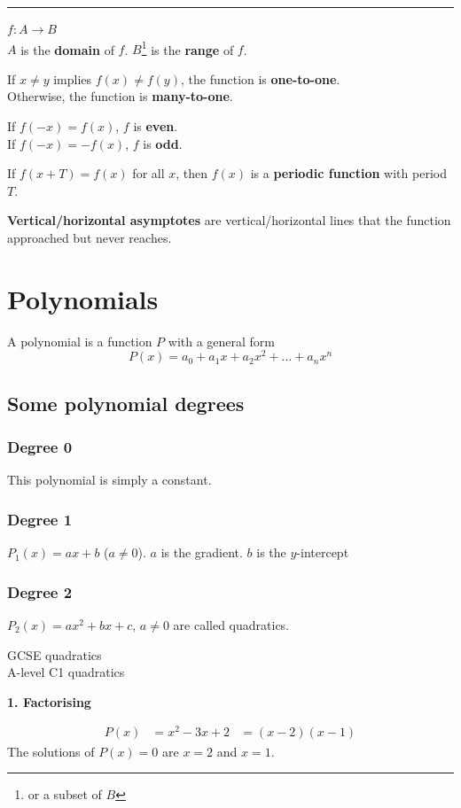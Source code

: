 \documentclass[11pt,a4paper,oneside]{book}
\begin{document}
\hrule

$f:A\rightarrow B$\\
$A$ is the \textbf{domain} of $f$. $B$\footnote{or a subset of $B$} is the \textbf{range} of $f$.

If \(x\not=y\) implies \(f(x)\not=f(y)\), the function is \textbf{one-to-one}.\\
Otherwise, the function is \textbf{many-to-one}.

If $f(-x)=f(x)$, $f$ is \textbf{even}.\\
If $f(-x)=-f(x)$, $f$ is \textbf{odd}.

If $f(x+T)=f(x)$ for all $x$, then $f(x)$ is a \textbf{periodic function} with period $T$.

\textbf{Vertical/horizontal asymptotes} are vertical/horizontal lines that the function approached but never reaches.

\section{Polynomials}

A polynomial is a function $P$ with a general form
$$P(x)=a_0 + a_1x + a_2x^2+\dots+a_nx^n$$

\subsection{Some polynomial degrees}
\subsubsection{Degree 0} This polynomial is simply a constant.

\subsubsection{Degree 1} $P_1(x)= ax+b$ ($a\ne 0$). $a$ is the gradient. $b$ is the $y$-intercept

\subsubsection{Degree 2} $P_2(x)=ax^2 +bx +c$, $a\ne 0$ are called quadratics.
\begin{gce}
GCSE quadratics\\
A-level C1 quadratics
\end{gce}

\textbf{1. Factorising}

\begin{example}
\begin{align*}
P(x)&=x^2-3x +2
&=(x-2)(x-1)
\end{align*}
The solutions of $P(x)=0$ are $x=2$ and $x=1$.
\end{example}
\end{document}
